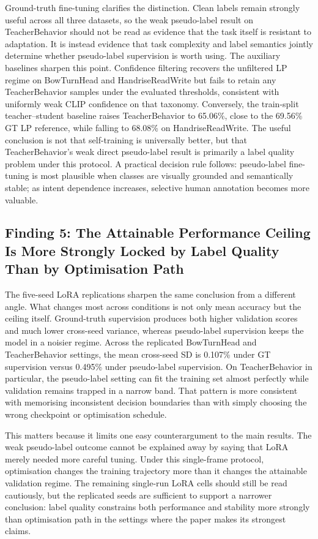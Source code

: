 \documentclass{ieeeaccess}
\begin{document}
Ground-truth fine-tuning clarifies the distinction.
Clean labels remain strongly useful across all three datasets, so the
weak pseudo-label result on TeacherBehavior should not be read as
evidence that the task itself is resistant to adaptation.
It is instead evidence that task complexity and label semantics jointly
determine whether pseudo-label supervision is worth using.
The auxiliary baselines sharpen this point. Confidence filtering
recovers the unfiltered LP regime on BowTurnHead and HandriseReadWrite
but fails to retain any TeacherBehavior samples under the evaluated
thresholds, consistent with uniformly weak CLIP confidence on that
taxonomy. Conversely, the train-split teacher--student baseline raises
TeacherBehavior to 65.06\%, close to the 69.56\% GT LP reference, while
falling to 68.08\% on HandriseReadWrite. The useful conclusion is
not that self-training is universally better, but that
TeacherBehavior's weak direct pseudo-label result is primarily a label
quality problem under this protocol.
A practical decision rule follows: pseudo-label fine-tuning is most
plausible when classes are visually grounded and semantically stable;
as intent dependence increases, selective human annotation becomes more
valuable.

\subsection{Finding 5: The Attainable Performance Ceiling Is More
Strongly Locked by Label Quality Than by Optimisation Path}

The five-seed LoRA replications sharpen the same conclusion from a
different angle.
What changes most across conditions is not only mean accuracy but the
ceiling itself.
Ground-truth supervision produces both higher validation scores and
much lower cross-seed variance, whereas pseudo-label supervision keeps
the model in a noisier regime.
Across the replicated BowTurnHead and TeacherBehavior settings, the
mean cross-seed SD is 0.107\% under GT supervision versus 0.495\%
under pseudo-label supervision.
On TeacherBehavior in particular, the pseudo-label setting can fit the
training set almost perfectly while validation remains trapped in a
narrow band.
That pattern is more consistent with memorising inconsistent decision
boundaries than with simply choosing the wrong checkpoint or
optimisation schedule.

This matters because it limits one easy counterargument to the main
results.
The weak pseudo-label outcome cannot be explained away by saying that
LoRA merely needed more careful tuning.
Under this single-frame protocol, optimisation changes the
training trajectory more than it changes the attainable validation
regime.
The remaining single-run LoRA cells should still be read cautiously,
but the replicated seeds are sufficient to support a narrower
conclusion: label quality constrains both performance and stability
more strongly than optimisation path in the settings where the paper
makes its strongest claims.
\end{document}
